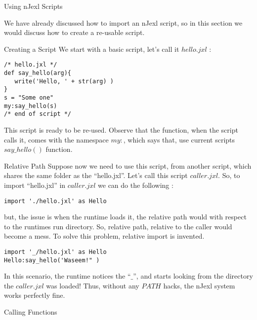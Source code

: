 \begin{section}{Using nJexl Scripts}

We have already discussed how to import an nJexl script, 
so in this section we would discuss how to create a re-usable script.

\begin{subsection}{Creating a Script}
We start with a basic script, let's call it $hello.jxl$ :

\begin{lstlisting}[style=JexlStyle]
/* hello.jxl */
def say_hello(arg){
   write('Hello, ' + str(arg) )
}
s = "Some one"
my:say_hello(s)
/* end of script */
\end{lstlisting}
This script is ready to be re-used.
Observe that the function, when the script calls it, 
comes with the namespace $my:$, which says that, 
use current scripts $say\_hello()$ function.

\end{subsection}


\begin{subsection}{Relative Path}
Suppose now we need to use this script, from another script, 
which shares the same folder as the ``hello.jxl''. 
Let's call this script $caller.jxl$. So, to import 
``hello.jxl'' in $caller.jxl$ we can do the following :

\begin{lstlisting}[style=JexlStyle]
import './hello.jxl' as Hello
\end{lstlisting}
   
but, the issue is when the runtime loads it, 
the relative path would with respect to the runtimes 
run directory. So, relative path, relative to the caller
would become a mess. To solve this problem, relative import is invented.

\begin{lstlisting}[style=JexlStyle]
import '_/hello.jxl' as Hello
Hello:say_hello('Waseem!" ) 
\end{lstlisting}

In this scenario, the runtime notices the ``$\_$'', and 
starts looking from the directory the $caller.jxl$ was loaded!    
Thus, without any $PATH$ hacks, the nJexl system works perfectly fine.

\end{subsection}

\begin{subsection}{Calling Functions}


\end{subsection}
\end{section}
